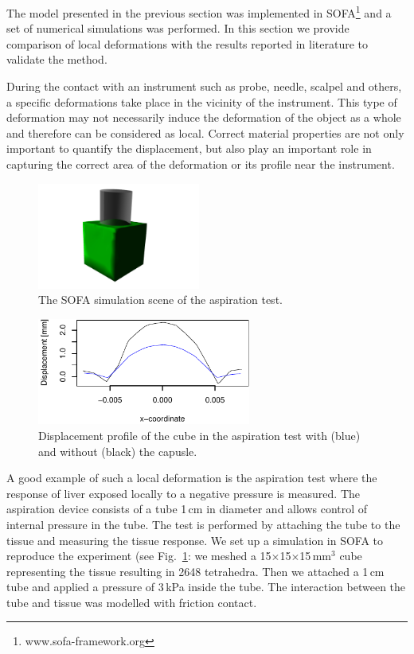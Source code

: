 \documentclass{acm_proc_article-sp}
\begin{document}
The model presented in the previous section was implemented in 
SOFA\footnote{www.sofa-framework.org} and a set of
numerical simulations was performed.
In this section we provide comparison of local deformations with the
results reported in literature to validate the method.

During the contact with an instrument such as probe, needle, scalpel and others,
a specific deformations take place in the vicinity of
the instrument. This type of deformation may not necessarily induce the
deformation of the object as a whole and therefore can be considered as
local. Correct material properties are not only important to quantify the
displacement, but also play an important role in capturing the correct area of
the deformation or its profile near the instrument.

\begin{figure}
  \centering
  \includegraphics[height=3.5cm]{aspiration.jpg}
  \caption{\label{fig-aspiration1} The SOFA simulation scene of the aspiration test.}
\end{figure}

\begin{figure}
  \centering
  \includegraphics[width=7cm]{aspiration.pdf}
  \caption{\label{fig-aspiration2} Displacement profile of the cube in the
  aspiration test with (blue) and without (black) the capusle.}
\end{figure}

A good example of such a local deformation is the aspiration test
where the response of liver exposed locally to a negative pressure is measured.
The aspiration device consists of a tube 1\,cm in diameter and allows
control of internal pressure in the tube. The test is performed by
attaching the tube to the tissue and measuring the tissue response. We
set up a simulation in SOFA to reproduce the experiment (see
Fig.~\ref{fig-aspiration1}: we meshed a 15$\times$15$\times$15\,mm$^3$ 
cube representing the tissue 
resulting in 2648 tetrahedra. Then we attached a 1\,cm tube 
and applied a pressure of 3\,kPa inside the tube. The interaction between the tube and 
tissue was modelled with friction contact. 
\end{document}
